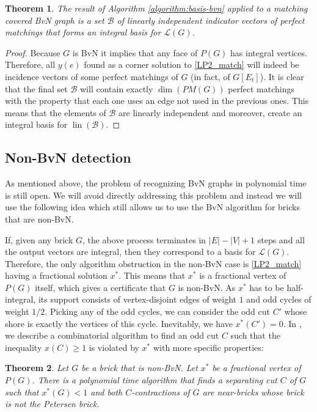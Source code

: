\documentclass[11pt]{article}
\DeclareMathOperator{\lin}{lin}
\newcommand{\1}{\mathbf{1}}
\newcommand{\0}{\mathbf{0}}
\newcommand{\zB}{\mathcal B}
\newcommand{\zL}{\mathcal L}
\newtheorem{theorem}{Theorem}[section]
\begin{document}
\begin{theorem}\label{thm:algo-correct}
    The result of Algorithm \ref{algorithm:basis-bvn} applied to a matching covered BvN graph is a set $\zB$ of linearly independent indicator vectors of perfect matchings that forms an integral basis for $\zL(G)$.
\end{theorem}
\begin{proof}
    Because $G$ is BvN it implies that any face of $P(G)$ has integral vertices. Therefore, all $y(e)$ found as a corner solution to \ref{LP2_match} will indeed be incidence vectors of some perfect matchings of $G$ (in fact, of $G[E_t]$). 
    It is clear that the final set $\zB$ will contain exactly $\dim(PM(G))$ perfect matchings with the property that each one uses an edge not used in the previous ones. This means that the elements of $\zB$ are linearly independent and moreover, create an integral basis for $\lin(\zB)$.
\end{proof}

\subsection{Non-BvN detection}\label{subsec:non-bvn-detect}

As mentioned above, the problem of recognizing BvN graphs in polynomial time is still open.
We will avoid directly addressing this problem and instead we will use the following idea which still allows us to use the BvN algorithm for bricks that are non-BvN.

If, given any brick $G$, the above process terminates in $|E|-|V|+1$ steps and all the output vectors are integral, then they correspond to a basis for $\zL(G)$.
Therefore, the only algorithm obstruction in the non-BvN case is \ref{LP2_match} having a fractional solution $x^*$. This means that $x^*$ is a fractional vertex of $P(G)$ itself, which gives a certificate that $G$ is non-BvN.
As $x^*$ has to be half-integral, its support consists of vertex-disjoint edges of weight $1$ and odd cycles of weight $1/2$. Picking any of the odd cycles, we can consider the odd cut $C'$ whose shore is exactly the vertices of this cycle. Inevitably, we have $x^*(C')=0$.
In , we describe a combinatorial algorithm to find an odd cut $C$ such that the inequality $x(C)\geq 1$ is violated by $x^*$ with more specific properties:
\begin{theorem}\label{thm:find-robust}
    Let $G$ be a brick that is non-BvN. Let $x^*$ be a fractional vertex of $P(G)$. There is a polynomial time algorithm that finds a separating cut $C$ of $G$ such that $x^*(G)<1$ and both $C$-contractions of $G$ are near-bricks whose brick is not the Petersen brick.
\end{theorem}
\end{document}
